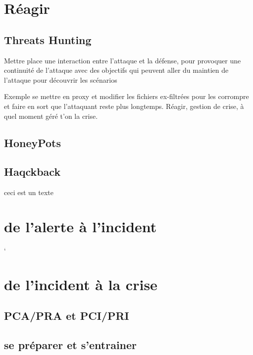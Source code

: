 
\section{Réagir}


\subsection{Threats Hunting}

Mettre place une interaction entre l'attaque et la défense, pour provoquer une continuité de l'attaque avec des objectifs qui peuvent aller du maintien de l'attaque pour découvrir les scénarios

Exemple se mettre en proxy et modifier les fichiers ex-filtrées pour les corrompre et faire en sort que l'attaquant reste plus longtemps.
Réagir, gestion de crise, à quel moment géré t’on la crise.

\subsection{HoneyPots}

\subsection{Haqckback}


ceci est un texte

\section{de l'alerte à l'incident}`

\section{de l'incident à la crise}

\subsection{PCA/PRA et PCI/PRI}

\subsection{se préparer et s'entrainer}

